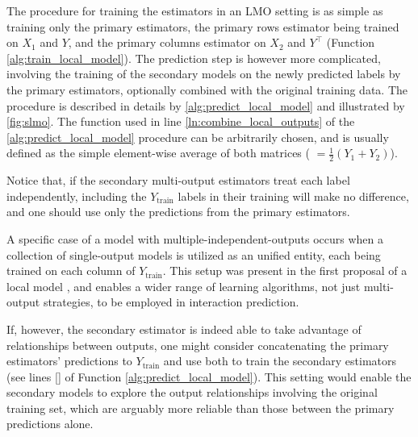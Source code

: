 The procedure for training the estimators in an LMO setting is as simple as training only the primary estimators, the primary rows estimator being trained on $X_1$ and $Y$, and the primary columns estimator on $X_2$ and $Y^\intercal$ (Function \ref{alg:train_local_model}). The prediction step is however more complicated, involving the training of the secondary models on the newly predicted labels by the primary estimators, optionally combined with the original training data. The procedure is described in details by \autoref{alg:predict_local_model} and illustrated by \autoref{fig:slmo}. The \KwCombine function used in line \autoref{ln:combine_local_outputs} of the \autoref{alg:predict_local_model} procedure can be arbitrarily chosen, and is usually defined as the simple element-wise average of both matrices ( $= \frac{1}{2}(Y_1 + Y_2)$).

\algTrainLocalModel
\algPredictLocalModel

Notice that, if the secondary multi-output estimators treat each label independently, including the $Y_\text{train}$ labels in their training will make no difference, and one should use only the predictions from the primary estimators.

A specific case of a model with multiple-independent-outputs occurs when a collection of single-output models is utilized as an unified entity, each being trained on each column of $Y_\text{train}$. This setup was present in the first proposal of a local model \cite{}, and enables a wider range of learning algorithms, not just multi-output strategies, to be employed in interaction prediction.

If, however, the secondary estimator is indeed able to take advantage of relationships between outputs, one might consider concatenating the primary estimators' predictions to $Y_\text{train}$ and use both to train the secondary estimators (see lines \ref{} of Function \ref{alg:predict_local_model}). This setting would enable the secondary models to explore the output relationships involving the original training set, which are arguably more reliable than those between the primary predictions alone.

